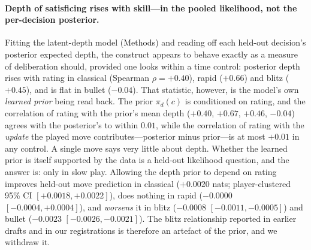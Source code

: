 \paragraph{Depth of satisficing rises with skill---in the pooled likelihood, not the per-decision posterior.}
Fitting the latent-depth model (Methods) and reading off each held-out decision's posterior
expected depth, the construct appears to behave exactly as a measure of deliberation should,
provided one looks within a time control: posterior depth rises with rating in classical
(Spearman $\rho=+0.40$), rapid ($+0.66$) and blitz ($+0.45$), and is flat in bullet ($-0.04$).
That statistic, however, is the model's own \emph{learned prior} being read back. The prior
$\pi_d(c)$ is conditioned on rating, and the correlation of rating with the prior's mean depth
($+0.40$, $+0.67$, $+0.46$, $-0.04$) agrees with the posterior's to within $0.01$, while the
correlation of rating with the \emph{update} the played move contributes---posterior minus
prior---is at most $+0.01$ in any control. A single move says very little about depth. Whether the
learned prior is itself supported by the data is a held-out likelihood question, and the
answer is: only in slow play. Allowing the depth prior to depend on rating improves held-out
move prediction in classical ($+0.0020$ nats; player-clustered 95\% CI $[+0.0018,+0.0022]$),
does nothing in rapid ($-0.0000$ $[-0.0004,+0.0004]$), and \emph{worsens} it in blitz
($-0.0008$ $[-0.0011,-0.0005]$) and bullet ($-0.0023$ $[-0.0026,-0.0021]$). The blitz
relationship reported in earlier drafts and in our registrations is therefore an artefact of
the prior, and we withdraw it.


